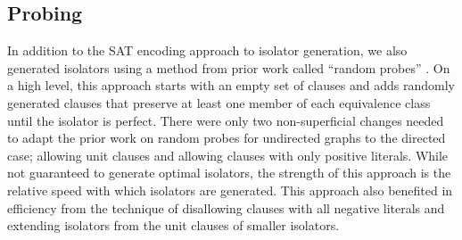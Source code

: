 \documentclass[conference]{IEEEtran}
\begin{document}
\subsection{Probing}
In addition to the SAT encoding approach to isolator generation, we also generated isolators using a method from prior work called ``random probes''  \cite{ref_heule}. On a high level, this approach starts with an empty set of clauses and adds randomly generated clauses that preserve at least one member of each equivalence class until the isolator is perfect.  There were only two non-superficial changes needed to adapt the prior work on random probes for undirected graphs to the directed case; allowing unit clauses and allowing clauses with only positive literals. While not guaranteed to generate optimal isolators, the strength of this approach is the relative speed with which isolators are generated. This approach also benefited in efficiency from the technique of disallowing clauses with all negative literals and extending isolators from the unit clauses of smaller isolators.


\end{document}
